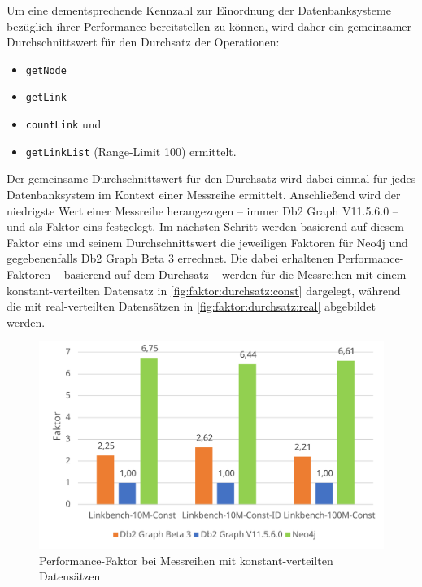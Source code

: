 Um eine dementsprechende Kennzahl zur Einordnung der Datenbanksysteme bezüglich ihrer Performance bereitstellen zu können, wird daher ein gemeinsamer Durchschnittswert für den Durchsatz der Operationen:
\begin{itemize}
    \item \texttt{getNode}
    \item \texttt{getLink}
    \item \texttt{countLink} und 
    \item \texttt{getLinkList} (Range-Limit 100) ermittelt.
\end{itemize}
Der gemeinsame Durchschnittswert für den Durchsatz wird dabei einmal für jedes Datenbanksystem im Kontext einer Messreihe ermittelt. Anschließend wird der niedrigste Wert einer Messreihe herangezogen -- immer Db2 Graph V11.5.6.0 -- und als Faktor eins festgelegt. Im nächsten Schritt werden basierend auf diesem Faktor eins und seinem Durchschnittswert die jeweiligen Faktoren für Neo4j und gegebenenfalls Db2 Graph Beta 3 errechnet. Die dabei erhaltenen Performance-Faktoren -- basierend auf dem Durchsatz -- werden für die Messreihen mit einem konstant-verteilten Datensatz in \autoref{fig:faktor:durchsatz:const} dargelegt, während die mit real-verteilten Datensätzen in \autoref{fig:faktor:durchsatz:real} abgebildet werden.

\begin{figure}[!ht]
    \centering
    \includegraphics[width=\textwidth]{images/diagramme/faktor_durchschittlicher_durchsatz_const.pdf}
    \caption{Performance-Faktor bei Messreihen mit konstant-verteilten Datensätzen}
    \label{fig:faktor:durchsatz:const}
\end{figure}

